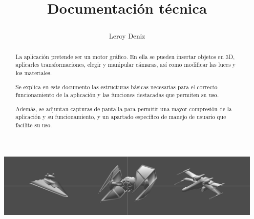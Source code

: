 \documentclass[12pt,a4paper]{article}
\begin{document}
\title{\begin{center}
\end{center}
\vspace{1cm}
Documentación técnica}

\author{Leroy Deniz}

\maketitle
\begin{abstract}
La aplicación pretende ser un motor gráfico.  En ella se pueden insertar objetos en 3D,  aplicarles transformaciones, elegir y manipular cámaras, así como modificar las luces y los materiales. 

Se explica en este documento las estructuras básicas necesarias para el correcto funcionamiento de la aplicación y las funciones destacadas que permiten su uso.

Además, se adjuntan capturas de pantalla para permitir una mayor compresión de la aplicación y su funcionamiento, y un apartado específico de manejo de usuario que facilite su uso.

\end{abstract}

\vspace{2cm}

\begin{center}
\includegraphics[width=14cm]{images/portada}
\end{center}


\newpage
\tableofcontents
\end{document}
